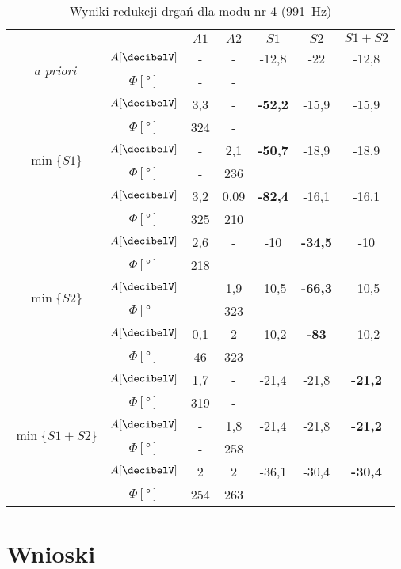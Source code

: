\documentclass[polish,a4paper,11pt]{mwart}
\let\Oldsection\section
\renewcommand{\section}{\FloatBarrier\Oldsection}
\begin{document}
  \begin{table}[!tbh]
    \centering
    \caption{Wyniki redukcji drgań dla modu nr 4 (\SI{991}{\hertz})}
    \label{tab:red4}
    \begin{tabular}{|c|c|c|c|c|c|c|}
      \cline{3-7}
      \multicolumn{2}{c|}{}&$A1$&$A2$&$S1$&$S2$&$S1+S2$\\\hline
      \multirow{2}{*}{\textit{a priori}} & $A [\si{\decibelV}]$ & - & - & -12,8 & -22 & -12,8\\\cline{2-7}
					 & $\Phi [\si{\degree}]$ & - & - & \multicolumn{3}{c}{}\\\hline
      \multirow{6}{*}{$\min\{S1\}$}   &   $A [\si{\decibelV}]$ & 3,3 & - & \textbf{-52,2} & -15,9 & -15,9\\\cline{2-7}
				      &$\Phi [\si{\degree}]$ & 324 & - & \multicolumn{3}{c}{}\\\cline{2-7}
				      &   $A [\si{\decibelV}]$ & - & 2,1 & \textbf{-50,7} & -18,9 & -18,9\\\cline{2-7}
				      &$\Phi [\si{\degree}]$ & - & 236 & \multicolumn{3}{c}{}\\\cline{2-7}
				      &   $A [\si{\decibelV}]$ & 3,2 & 0,09 & \textbf{-82,4} & -16,1 & -16,1\\\cline{2-7}
				      &$\Phi [\si{\degree}]$ & 325 & 210 & \multicolumn{3}{c}{}\\\hline
      \multirow{6}{*}{$\min\{S2\}$}   &   $A [\si{\decibelV}]$ & 2,6 & - & -10 & \textbf{-34,5} & -10\\\cline{2-7}
				      &$\Phi [\si{\degree}]$ & 218 & - & \multicolumn{3}{c}{}\\\cline{2-7}
				      &   $A [\si{\decibelV}]$ & - & 1,9 & -10,5 & \textbf{-66,3} & -10,5\\\cline{2-7}
				      &$\Phi [\si{\degree}]$ & - & 323 & \multicolumn{3}{c}{}\\\cline{2-7}
				      &   $A [\si{\decibelV}]$ & 0,1 & 2 & -10,2 & \textbf{-83} & -10,2\\\cline{2-7}
				      &$\Phi [\si{\degree}]$ & 46 & 323 & \multicolumn{3}{c}{}\\\hline
      \multirow{6}{*}{$\min\{S1+S2\}$}&   $A [\si{\decibelV}]$ & 1,7 & - & -21,4 & -21,8 & \textbf{-21,2} \\\cline{2-7}
				      &$\Phi [\si{\degree}]$ & 319 & - & \multicolumn{3}{c}{}\\\cline{2-7}
				      &   $A [\si{\decibelV}]$ & - & 1,8 & -21,4 & -21,8 & \textbf{-21,2} \\\cline{2-7}
				      &$\Phi [\si{\degree}]$ & - & 258 & \multicolumn{3}{c}{}\\\cline{2-7}
				      &   $A [\si{\decibelV}]$ & 2 & 2 & -36,1 & -30,4 & \textbf{-30,4} \\\cline{2-7}
				      &$\Phi [\si{\degree}]$ & 254 & 263 & \multicolumn{3}{c}{}\\\cline{1-4}
    \end{tabular}
  \end{table}

  \section{Wnioski}
  
\end{document}
